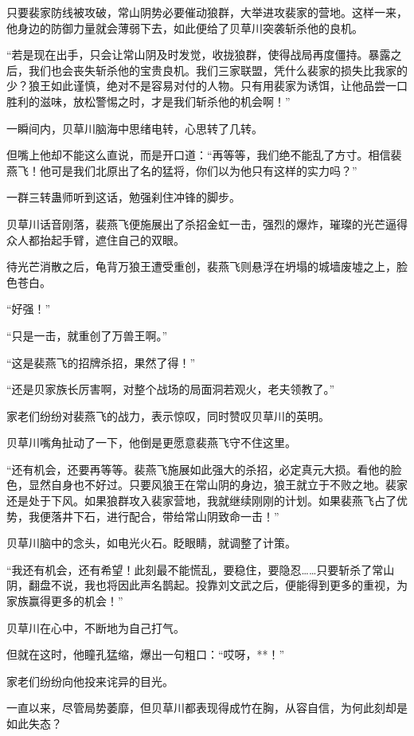\begin{this_body}
只要裴家防线被攻破，常山阴势必要催动狼群，大举进攻裴家的营地。这样一来，他身边的防御力量就会薄弱下去，如此便给了贝草川突袭斩杀他的良机。

“若是现在出手，只会让常山阴及时发觉，收拢狼群，使得战局再度僵持。暴露之后，我们也会丧失斩杀他的宝贵良机。我们三家联盟，凭什么裴家的损失比我家的少？狼王如此谨慎，绝对不是容易对付的人物。只有用裴家为诱饵，让他品尝一口胜利的滋味，放松警惕之时，才是我们斩杀他的机会啊！”

一瞬间内，贝草川脑海中思绪电转，心思转了几转。

但嘴上他却不能这么直说，而是开口道：“再等等，我们绝不能乱了方寸。相信裴燕飞！他可是我们北原出了名的猛将，你们以为他只有这样的实力吗？”

一群三转蛊师听到这话，勉强刹住冲锋的脚步。

贝草川话音刚落，裴燕飞便施展出了杀招金虹一击，强烈的爆炸，璀璨的光芒逼得众人都抬起手臂，遮住自己的双眼。

待光芒消散之后，龟背万狼王遭受重创，裴燕飞则悬浮在坍塌的城墙废墟之上，脸色苍白。

“好强！”

“只是一击，就重创了万兽王啊。”

“这是裴燕飞的招牌杀招，果然了得！”

“还是贝家族长厉害啊，对整个战场的局面洞若观火，老夫领教了。”

家老们纷纷对裴燕飞的战力，表示惊叹，同时赞叹贝草川的英明。

贝草川嘴角扯动了一下，他倒是更愿意裴燕飞守不住这里。

“还有机会，还要再等等。裴燕飞施展如此强大的杀招，必定真元大损。看他的脸色，显然自身也不好过。只要风狼王在常山阴的身边，狼王就立于不败之地。裴家还是处于下风。如果狼群攻入裴家营地，我就继续刚刚的计划。如果裴燕飞占了优势，我便落井下石，进行配合，带给常山阴致命一击！”

贝草川脑中的念头，如电光火石。眨眼睛，就调整了计策。

“我还有机会，还有希望！此刻最不能慌乱，要稳住，要隐忍……只要斩杀了常山阴，翻盘不说，我也将因此声名鹊起。投靠刘文武之后，便能得到更多的重视，为家族赢得更多的机会！”

贝草川在心中，不断地为自己打气。

但就在这时，他瞳孔猛缩，爆出一句粗口：“哎呀，**！”

家老们纷纷向他投来诧异的目光。

一直以来，尽管局势萎靡，但贝草川都表现得成竹在胸，从容自信，为何此刻却是如此失态？


\end{this_body}
